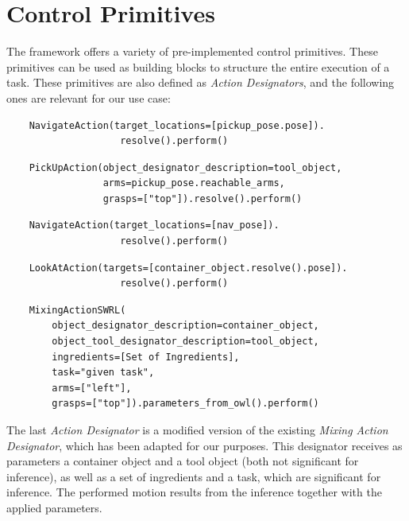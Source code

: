 \section{Control Primitives}
The framework  \cite{pycram} offers a variety of pre-implemented control primitives. These primitives can be used as building blocks to structure the entire execution of a task. These primitives are also defined as \textit{Action Designators}, and the following ones are relevant for our use case:

\begin{lstlisting}
	NavigateAction(target_locations=[pickup_pose.pose]).
					resolve().perform()
\end{lstlisting}
\begin{lstlisting}
	PickUpAction(object_designator_description=tool_object,
                 arms=pickup_pose.reachable_arms,
                 grasps=["top"]).resolve().perform()
\end{lstlisting}

\begin{lstlisting}
	NavigateAction(target_locations=[nav_pose]).
					resolve().perform()
\end{lstlisting}

\begin{lstlisting}
	LookAtAction(targets=[container_object.resolve().pose]).
					resolve().perform()
\end{lstlisting}

\begin{lstlisting}
	MixingActionSWRL(
		object_designator_description=container_object,
        object_tool_designator_description=tool_object,
		ingredients=[Set of Ingredients],
        task="given task",
        arms=["left"],
        grasps=["top"]).parameters_from_owl().perform()
\end{lstlisting}

The last \textit{Action Designator} is a modified version of the existing \textit{Mixing Action Designator}, which has been adapted for our purposes. This designator receives as parameters a container object and a tool object (both not significant for inference), as well as a set of ingredients and a task, which are significant for inference. The performed motion results from the inference together with the applied parameters.

